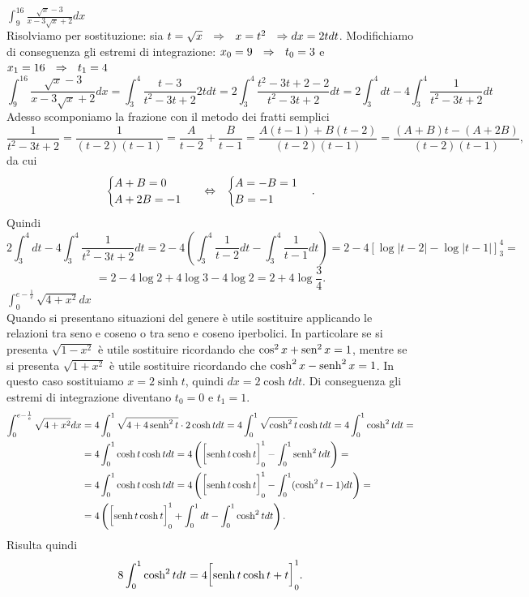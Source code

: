 \documentclass{article}
\begin{document}
\begin{enumerate}[label=\textbf{Esercizio 11.\arabic*.},itemindent=*]
\begin{tasks}
    \task \(\int_{9}^{16}\frac{\sqrt{x}-3}{x-3\sqrt{x}+2}dx\)\\
    Risolviamo per sostituzione: sia $t=\sqrt{x}~~\Rightarrow~~x=t^2~~\Rightarrow dx=2tdt$. Modifichiamo di conseguenza gli estremi di integrazione: $x_0 =9~~\Rightarrow~~t_0=3$ e $x_1 =16~~\Rightarrow ~~t_1=4$
    \[\int_{9}^{16}\frac{\sqrt{x}-3}{x-3\sqrt{x}+2}dx=\int_3^4\frac{t-3}{t^2-3t+2}2tdt=2\int _3^4\frac{t^2-3t+2-2}{t^2-3t+2}dt=2\int_3^4dt-4\int_3^4 \frac{1}{t^2-3t+2}dt\]
    Adesso scomponiamo la frazione con il metodo dei fratti semplici
    \[\frac{1}{t^2-3t+2}=\frac{1}{(t-2)(t-1)}=\frac{A}{t-2}+\frac{B}{t-1}=\frac{A(t-1)+B(t-2)}{(t-2)(t-1)}=\frac{(A+B)t-(A+2B)}{(t-2)(t-1)},\]
    da cui \[\begin{cases}
        A+B=0\\A+ 2B=-1
    \end{cases}~~\Leftrightarrow~~\begin{cases}
        A=-B=1\\B=-1
    \end{cases}.\]
    Quindi
    \[2\int_3^4dt-4\int_3^4 \frac{1}{t^2-3t+2}dt=2- 4\left( \int_3^4\frac{1}{t-2}dt -\int_3^4\frac{1}{t-1}dt\right)=2-4\left[ \log|t-2| -\log|t-1|\right]_3^4=\]\[=2-4\log2+4\log3-4\log2=2+4\log\frac{3}{4}.\]
    \task \(\int_{0}^{e-\frac{1}{e}}\sqrt{4 +x^2}dx\)\\
    Quando si presentano situazioni del genere è utile sostituire applicando le relazioni tra seno e coseno o tra seno e coseno iperbolici. In particolare se si presenta $\sqrt{1-x^2}$ è utile sostituire ricordando che $\cos^2x+\operatorname{sen}^2x=1$, mentre se si presenta $\sqrt{1+x^2}$ è utile sostituire ricordando che $\cosh^2x-\operatorname{senh}^2x=1$. In questo caso sostituiamo $x=2\sinh t$, quindi $dx=2\cosh t dt$. Di conseguenza gli estremi di integrazione diventano $t_0=0$ e $t_1=1$.
    \[
    \begin{aligned}
        \int_{0}^{e-\frac{1}{e}}\sqrt{4 +x^2}dx&= 4\int_0^1\sqrt{4+4\operatorname{senh}^2t}\cdot 2\cosh tdt=4\int_0^1\sqrt{\cosh^2t}\cosh t dt= 4\int_0^1\cosh^2 tdt=\\&=4\int_0^1\cosh t\cosh t dt=4\left( \biggl[ \operatorname{senh} t\cosh t \biggr]_0^1-\int_0^1\operatorname{senh}^2tdt \right)=\\&=4\int_0^1\cosh t\cosh t dt=4\left( \biggl[ \operatorname{senh} t\cosh t \biggr]_0^1-\int_0^1(\cosh^2t-1)dt \right)=\\&=4\left( \biggl[\operatorname{senh} t\cosh t\biggr]_0^1+\int _0^1dt-\int_0^1\cosh^2tdt \right).
    \end{aligned}\]
   Risulta quindi 
    \[8\int_0^1\cosh^2tdt=4\biggl[\operatorname{senh} t\cosh t +t\biggr]_0^1.\]

\end{tasks}
\end{enumerate}
\end{document}

